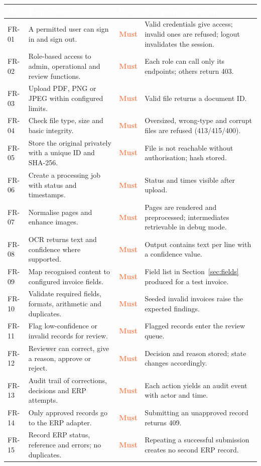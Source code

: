 \documentclass[11pt,a4paper]{report}
\newcommand{\hdr}[1]{\textcolor{white}{\sffamily\bfseries #1}}
\newcommand{\tblstart}{\rowcolors{2}{white}{rowgray}\arrayrulecolor{teal!60}}
\newcommand{\hdrrow}{\rowcolor{navy}}
\newcommand{\must}{\textcolor{coral}{\sffamily\bfseries Must}}
\begin{document}
{\tblstart\footnotesize
\begin{longtable}{L{1.2cm}L{5.6cm}L{1.3cm}L{5.4cm}}
\hdrrow \hdr{ID} & \hdr{Requirement} & \hdr{Prio.} & \hdr{Acceptance criterion}\\ \endhead
FR-01 & A permitted user can sign in and sign out. & \must & Valid credentials give access; invalid ones are refused; logout invalidates the session.\\
FR-02 & Role-based access to admin, operational and review functions. & \must & Each role can call only its endpoints; others return 403.\\
FR-03 & Upload PDF, PNG or JPEG within configured limits. & \must & Valid file returns a document ID.\\
FR-04 & Check file type, size and basic integrity. & \must & Oversized, wrong-type and corrupt files are refused (413/415/400).\\
FR-05 & Store the original privately with a unique ID and SHA-256. & \must & File is not reachable without authorisation; hash stored.\\
FR-06 & Create a processing job with status and timestamps. & \must & Status and times visible after upload.\\
FR-07 & Normalise pages and enhance images. & \must & Pages are rendered and preprocessed; intermediates retrievable in debug mode.\\
FR-08 & OCR returns text and confidence where supported. & \must & Output contains text per line with a confidence value.\\
FR-09 & Map recognised content to configured invoice fields. & \must & Field list in Section~\ref{sec:fields} produced for a test invoice.\\
FR-10 & Validate required fields, formats, arithmetic and duplicates. & \must & Seeded invalid invoices raise the expected findings.\\
FR-11 & Flag low-confidence or invalid records for review. & \must & Flagged records enter the review queue.\\
FR-12 & Reviewer can correct, give a reason, approve or reject. & \must & Decision and reason stored; state changes accordingly.\\
FR-13 & Audit trail of corrections, decisions and ERP attempts. & \must & Each action yields an audit event with actor and time.\\
FR-14 & Only approved records go to the ERP adapter. & \must & Submitting an unapproved record returns 409.\\
FR-15 & Record ERP status, reference and errors; no duplicates. & \must & Repeating a successful submission creates no second ERP record.\\

\end{longtable}}
\end{document}
